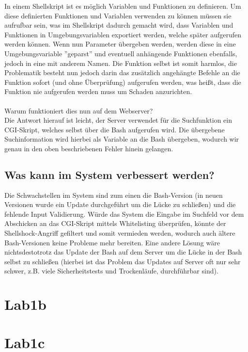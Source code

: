 \documentclass[12pt,a4paper,titlepage,oneside]{scrartcl}
\begin{document}
In einem Shellskript ist es möglich Variablen und Funktionen zu definieren. Um diese definierten Funktionen und Variablen verwenden zu können müssen sie aufrufbar sein, was im Shellskript dadurch gemacht wird, dass Variablen und Funktionen in Umgebungsvariablen exportiert werden, welche später aufgerufen werden können. Wenn nun Parameter übergeben werden, werden diese in eine Umgebungsvariable ''geparst'' und eventuell anhängende Funktionen ebenfalls, jedoch in eine mit anderem Namen. Die Funktion selbst ist somit harmlos, die Problematik besteht nun jedoch darin das zusätzlich angehängte Befehle an die Funktion sofort (und ohne Überprüfung) aufgerufen werden, was heißt, dass die Funktion nie aufgerufen werden muss um Schaden anzurichten. \\
\\
Warum funktioniert dies nun auf dem Webserver? \\
Die Antwort hierauf ist leicht, der Server verwendet für die Suchfunktion ein CGI-Skript, welches selbst über die Bash aufgerufen wird. Die übergebene Suchinformation wird hierbei als Variable an die Bash übergeben, wodurch wir genau in den oben beschriebenen Fehler hinein gelangen.

\subsection{Was kann im System verbessert werden?}

Die Schwachstellen im System sind zum einen die Bash-Version (in neuen Versionen wurde ein Update durchgeführt um die Lücke zu schließen) und die fehlende Input Validierung. Würde das System die Eingabe im Suchfeld vor dem Abschicken an das CGI-Skript mittels Whitelisting überprüfen, könnte der Shellshock-Angriff gefiltert und somit vermieden werden, wodurch auch ältere Bash-Versionen keine Probleme mehr bereiten. Eine andere Lösung wäre nichtsdestotrotz das Update der Bash auf dem Server um die Lücke in der Bash selbst zu schließen (hierbei ist das Problem das Updates auf Server oft nur sehr schwer, z.B. viele Sicherheitstests und Trockenläufe, durchführbar sind).

\section{Lab1b}

\section{Lab1c}
\end{document}
